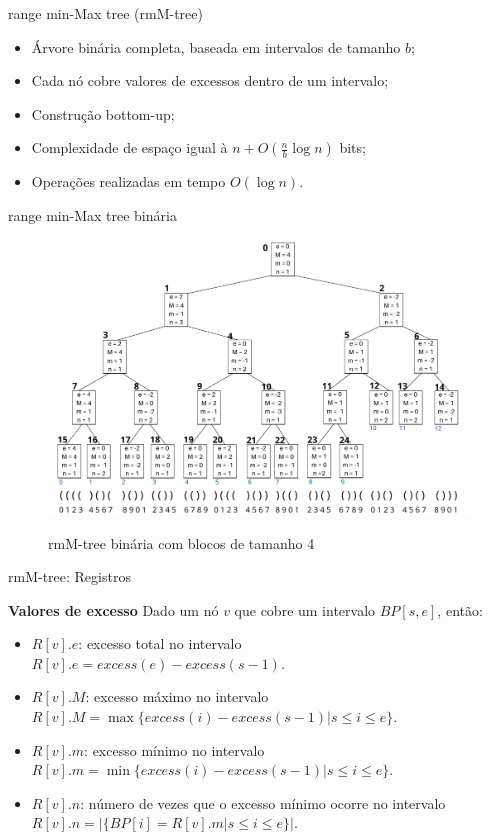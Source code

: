 \begin{frame}{range min-Max tree (rmM-tree)}
    \begin{itemize}
        \item Árvore binária completa, baseada em intervalos de tamanho $b$;
        \item Cada nó cobre valores de excessos dentro de um intervalo;
        \item Construção bottom-up;
        \item Complexidade de espaço igual à $n + O(\frac{n}{b} \log n)$ bits;
        \item Operações realizadas em tempo $O(\log n)$.
    \end{itemize}
\end{frame}

\begin{frame}{range min-Max tree binária}
    \begin{figure}[h!]
        \centering
        \includegraphics[scale=0.3]{images/rmm-tree-bin.png}\\
        \caption{rmM-tree binária com blocos de tamanho 4}
    \end{figure} 
\end{frame}

\begin{frame}{rmM-tree: Registros}

    \textbf{Valores de excesso}
        Dado um nó $v$ que cobre um intervalo $BP[s,e]$, então:
        \begin{itemize}
            \item $R[v].e$: excesso total no intervalo\\
            $R[v].e = excess(e)-excess(s-1)$.
            \item $R[v].M$: excesso máximo no intervalo\\
            $R[v].M = \max\{excess(i) - excess(s - 1) | s \leq i \leq e\}$.
            \item $R[v].m$: excesso mínimo no intervalo\\
            $R[v].m = \min\{excess(i) - excess(s - 1) | s \leq i \leq e\}$.
            \item $R[v].n$: número de vezes que o excesso mínimo ocorre no intervalo\\
            $R[v].n = |\{BP[i]=R[v].m | s \leq i \leq e\}|$.
        \end{itemize}
\end{frame}

